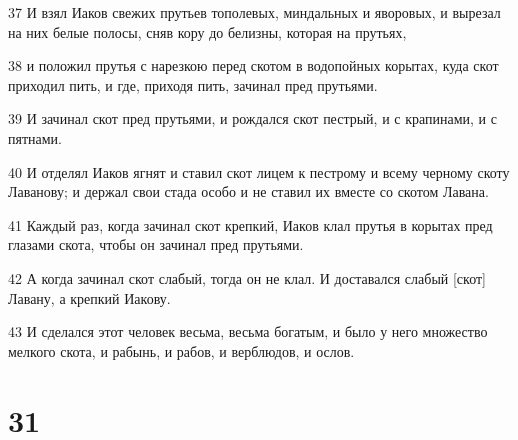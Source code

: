 \par 37 И взял Иаков свежих прутьев тополевых, миндальных и яворовых, и вырезал на них белые полосы, сняв кору до белизны, которая на прутьях,
\par 38 и положил прутья с нарезкою перед скотом в водопойных корытах, куда скот приходил пить, и где, приходя пить, зачинал пред прутьями.
\par 39 И зачинал скот пред прутьями, и рождался скот пестрый, и с крапинами, и с пятнами.
\par 40 И отделял Иаков ягнят и ставил скот лицем к пестрому и всему черному скоту Лаванову; и держал свои стада особо и не ставил их вместе со скотом Лавана.
\par 41 Каждый раз, когда зачинал скот крепкий, Иаков клал прутья в корытах пред глазами скота, чтобы он зачинал пред прутьями.
\par 42 А когда зачинал скот слабый, тогда он не клал. И доставался слабый [скот] Лавану, а крепкий Иакову.
\par 43 И сделался этот человек весьма, весьма богатым, и было у него множество мелкого скота, и рабынь, и рабов, и верблюдов, и ослов.

\chapter{31}

